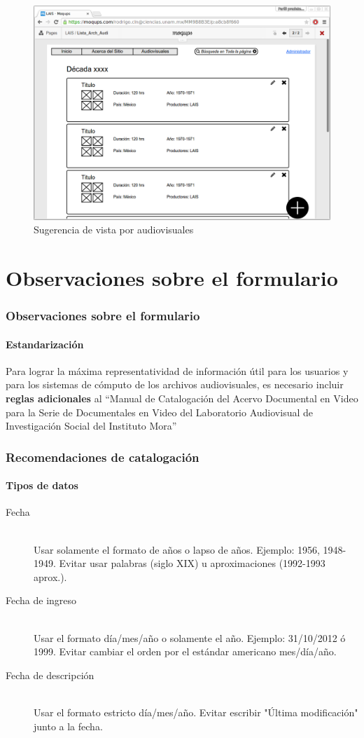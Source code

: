 \documentclass{beamer}
\begin{document}
\begin{frame}
	\begin{figure}[H]
		\centering
		\includegraphics[keepaspectratio=true,width=\linewidth]{Prototipo_09.png}
		\caption{Sugerencia de vista por audiovisuales}
		\label{fig:protipo_angular}
	\end{figure}	
\end{frame}

\section{Observaciones sobre el formulario}
\begin{frame}
	\frametitle{Observaciones sobre el formulario}
	\framesubtitle{Estandarización}
	Para lograr la máxima representatividad de información útil para los usuarios y para los sistemas de cómputo de los archivos audiovisuales, es necesario incluir \textbf{reglas adicionales} al ``Manual de Catalogación del Acervo Documental en Video para la Serie de Documentales en Video del Laboratorio Audiovisual de Investigación Social del Instituto Mora''
\end{frame}

\begin{frame}
	\frametitle{Recomendaciones de catalogación}
	\framesubtitle{Tipos de datos}
	\begin{description}
		\item[Fecha] \hfill \\
			Usar solamente el formato de años o lapso de años. Ejemplo: 1956, 1948-1949. Evitar usar palabras (siglo XIX) u aproximaciones (1992-1993 aprox.).
		\item[Fecha de ingreso] \hfill \\
			Usar el formato día/mes/año o solamente el año. Ejemplo: 31/10/2012 ó 1999. Evitar cambiar el orden por el estándar americano mes/día/año.
		\item[Fecha de descripción] \hfill \\
			Usar el formato estricto día/mes/año. Evitar escribir "Última modificación" junto a la fecha.
	\end{description}
\end{frame}
\end{document}
